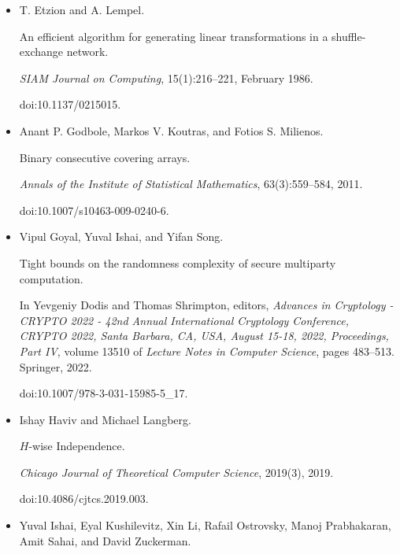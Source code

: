 \begin{itemize}
\item[] 
[5]

T. Etzion and A. Lempel.


An efficient algorithm for generating linear transformations in a
shuffle-exchange network.


\emph{SIAM Journal on Computing}, 15(1):216–221, February 1986.


doi:10.1137/0215015.





\item[] 
[6]

Anant P. Godbole, Markos V. Koutras, and Fotios S. Milienos.


Binary consecutive covering arrays.


\emph{Annals of the Institute of Statistical Mathematics},
63(3):559–584, 2011.


doi:10.1007/s10463-009-0240-6.





\item[] 
[7]

Vipul Goyal, Yuval Ishai, and Yifan Song.


Tight bounds on the randomness complexity of secure multiparty
computation.


In Yevgeniy Dodis and Thomas Shrimpton, editors, \emph{Advances in
Cryptology - CRYPTO 2022 - 42nd Annual International Cryptology Conference,
CRYPTO 2022, Santa Barbara, CA, USA, August 15-18, 2022, Proceedings, Part
IV}, volume 13510 of \emph{Lecture Notes in Computer Science}, pages
483–513. Springer, 2022.


doi:10.1007/978-3-031-15985-5\_17.





\item[] 
[8]

Ishay Haviv and Michael Langberg.


$H$-wise Independence.


\emph{Chicago Journal of Theoretical Computer Science}, 2019(3), 2019.


doi:10.4086/cjtcs.2019.003.





\item[] 
[9]

Yuval Ishai, Eyal Kushilevitz, Xin Li, Rafail Ostrovsky, Manoj Prabhakaran,
Amit Sahai, and David Zuckerman.



\end{itemize}
